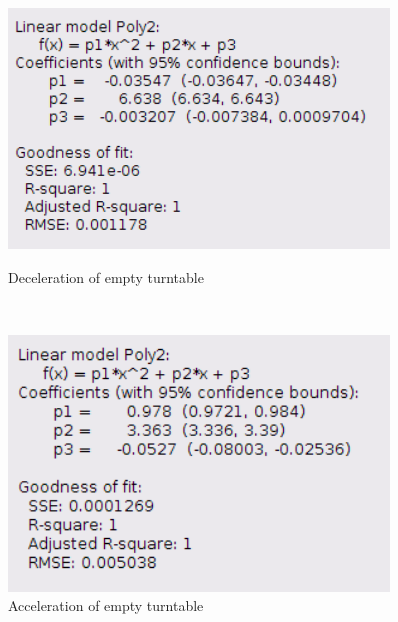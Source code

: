     \begin{figure}[H]
    \centering
    \begin{minipage}{0.45\textwidth}
        \includegraphics[width=0.9\textwidth]{images/11info}
        \caption{Deceleration of empty turntable}\label{11info}
    \end{minipage}
    ~
    \begin{minipage}{0.45\textwidth}
        \includegraphics[width=0.9\textwidth]{images/12info}
        \caption{Acceleration of empty turntable}\label{12info}
    \end{minipage}
    \end{figure}

